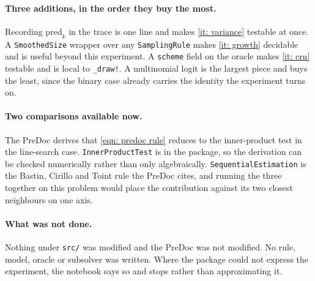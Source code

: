 \documentclass[11pt,a4paper]{article}
\begin{document}
\paragraph{Three additions, in the order they buy the most.}
Recording $\mathrm{pred}_k$ in the trace is one line and makes \ref{it: variance}
testable at once. A \texttt{SmoothedSize} wrapper over any \texttt{SamplingRule}
makes \ref{it: growth} decidable and is useful beyond this experiment. A
\texttt{scheme} field on the oracle makes \ref{it: crn} testable and is local to
\texttt{\_draw!}. A multinomial logit is the largest piece and buys the least,
since the binary case already carries the identity the experiment turns on.

\paragraph{Two comparisons available now.}
The PreDoc derives that \eqref{eqn: predoc rule} reduces to the inner-product test
in the line-search case. \texttt{InnerProductTest} is in the package, so the
derivation can be checked numerically rather than only algebraically.
\texttt{SequentialEstimation} is the Bastin, Cirillo and Toint rule the PreDoc
cites, and running the three together on this problem would place the
contribution against its two closest neighbours on one axis.

\paragraph{What was not done.}
Nothing under \texttt{src/} was modified and the PreDoc was not modified. No rule,
model, oracle or subsolver was written. Where the package could not express the
experiment, the notebook says so and stops rather than approximating it.
\end{document}
